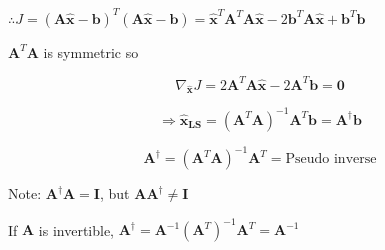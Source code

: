 \documentclass[fleqn]{article}
\begin{document}
	$\therefore J = (\mathbf{A\hat{x}} - \mathbf{b})^T(\mathbf{A\hat{x}} - \mathbf{b}) = \mathbf{\hat{x}}^T\mathbf{A}^T\mathbf{A}\mathbf{\hat{x}} - 2\mathbf{b}^T\mathbf{A\hat{x}} + \mathbf{b}^T\mathbf{b}$
	
	$\mathbf{A}^T\mathbf{A}$ is symmetric so
	
	\begin{equation*}
		\nabla_{\mathbf{\hat{x}}}J = 2\mathbf{A}^T\mathbf{A\hat{x}} - 2\mathbf{A}^T\mathbf{b} = \mathbf{0}
	\end{equation*}
	
	\begin{equation*}
		\Rightarrow \mathbf{\hat{x}_{LS}} = (\mathbf{A}^T\mathbf{A})^{-1}\mathbf{A}^T\mathbf{b} = \mathbf{A}^{\dag}\mathbf{b}
	\end{equation*}
	
	\begin{equation*}
		\mathbf{A}^{\dag} = (\mathbf{A}^T\mathbf{A})^{-1}\mathbf{A}^T = \text{Pseudo inverse}
	\end{equation*}
	
	Note: $\mathbf{A}^{\dag}\mathbf{A} = \mathbf{I}$, but $\mathbf{A}\mathbf{A}^{\dag} \neq \mathbf{I}$
	
	If $\mathbf{A}$ is invertible, $\mathbf{A}^{\dag} = \mathbf{A}^{-1}\left(\mathbf{A}^T\right)^{-1}\mathbf{A}^T = \mathbf{A}^{-1}$
\end{document}
